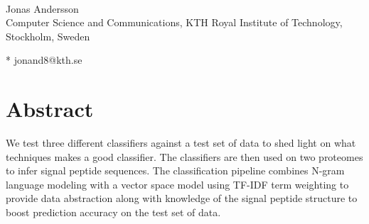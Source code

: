 \documentclass[10pt,letterpaper]{article}
\date{}
\begin{document}
	\vspace*{0.2in}
	
	\begin{flushleft}
		{\Large
			\textbf{} %
		}
		\newline
		\\
		Jonas Andersson
		\\
		\bigskip
		Computer Science and Communications, KTH Royal Institute of Technology, Stockholm, Sweden
		\bigskip
		
		
		
		
		
		
		* jonand8@kth.se
		
	\end{flushleft}
	\section*{Abstract}
	We test three different classifiers against a test set of data to shed light on what techniques makes a good classifier. The classifiers are then used on two proteomes to infer signal peptide sequences. The classification pipeline combines N-gram language modeling with a vector space model using TF-IDF term weighting to provide data abstraction along with knowledge of the signal peptide structure to boost prediction accuracy on the test set of data. 
	
\end{document}
